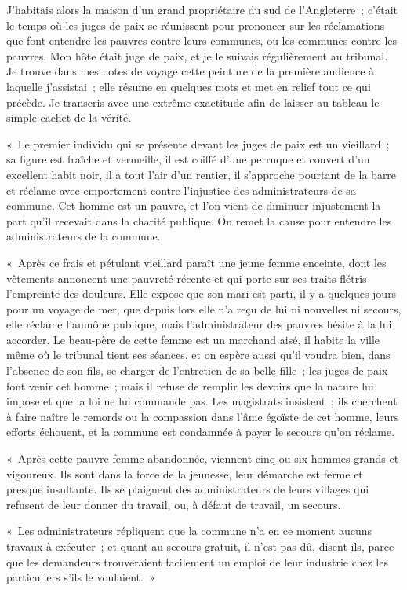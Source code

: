 \documentclass[twoside]{book} %
\newenvironment{quoteblock}
  {\begin{quoting}\setstretch{0.9}} %
  {\end{quoting}}
\newcommand{\quoteskip}{\medskip}
\newenvironment{quotebar}{%
    \def\FrameCommand{{\color{rubric!10!}\vrule width 0.5em} \hspace{0.9em}}%
    \def\OuterFrameSep{0pt} %
    \MakeFramed {\advance\hsize-\width \FrameRestore}
  }%
  {%
    \endMakeFramed
  }
\renewenvironment{quoteblock}%
  {%
    \savenotes
    \setstretch{0.9}
    \begin{quotebar}
    \smallskip
  }
  {%
    \smallskip
    \end{quotebar}
    \spewnotes
  }
\begin{document}
J'habitais alors la maison d’un grand propriétaire du sud de l’Angleterre ; c’était le temps où les juges de paix se réunissent pour prononcer sur les réclamations que font entendre les pauvres contre leurs communes, ou les communes contre les pauvres. Mon hôte était juge de paix, et je le suivais régulièrement au tribunal. Je trouve dans mes notes de voyage cette peinture de la première audience à laquelle j’assistai ; elle résume en quelques mots et met en relief tout ce qui précède. Je transcris avec une extrême exactitude afin de laisser au tableau le simple cachet de la vérité.\par
\quoteskip\begin{quoteblock}
 \noindent « Le premier individu qui se présente devant les juges de paix est un vieillard ; sa figure est fraîche et vermeille, il est coiffé d’une perruque et couvert d’un excellent habit noir, il a tout l’air d’un rentier, il s’approche pourtant de la barre et réclame avec emportement contre l’injustice des administrateurs de sa commune. Cet homme est un pauvre, et l’on vient de diminuer injustement la part qu’il recevait dans la charité publique. On remet la cause pour entendre les administrateurs de la commune.\par
 « Après ce frais et pétulant vieillard paraît une jeune femme enceinte, dont les vêtements annoncent une pauvreté récente et qui porte sur ses traits flétris l’empreinte des douleurs. Elle expose que son mari est parti, il y a quelques jours pour un voyage de mer, que depuis lors elle n’a reçu de lui ni nouvelles ni secours, elle réclame l’aumône publique, mais l’administrateur des pauvres hésite à la lui accorder. Le beau-père de cette femme est un marchand aisé, il habite la ville même où le tribunal tient ses séances, et on espère aussi qu’il voudra bien, dans l’absence de son fils, se charger de l’entretien de sa belle-fille ; les juges de paix font venir cet homme ; mais il refuse de remplir les devoirs que la nature lui impose et que la loi ne lui commande pas. Les magistrats insistent ; ils cherchent à faire naître le remords ou la compassion dans l’âme égoïste de cet homme, leurs efforts échouent, et la commune est condamnée à payer le secours qu’on réclame.\par
 « Après cette pauvre femme abandonnée, viennent cinq ou six hommes grands et vigoureux. Ils sont dans la force de la jeunesse, leur démarche est ferme et presque insultante. Ils se plaignent des administrateurs de leurs villages qui refusent de leur donner du travail, ou, à défaut de travail, un secours.\par
 « Les administrateurs répliquent que la commune n’a en ce moment aucuns travaux à exécuter ; et quant au secours gratuit, il n’est pas dû, disent-ils, parce que les demandeurs trouveraient facilement un emploi de leur industrie chez les particuliers s’ils le voulaient. »
 \end{quoteblock}\quoteskip
\end{document}

